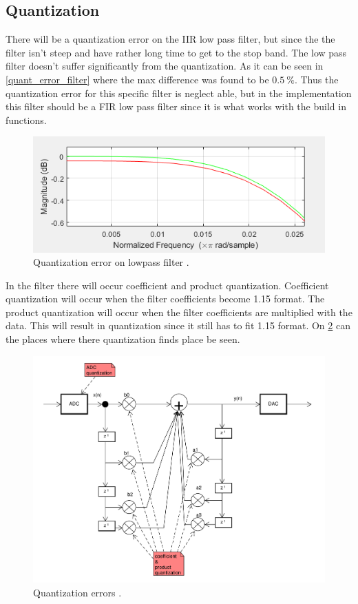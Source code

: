 \subsection{Quantization} 
There will be a quantization error on the IIR low pass filter, but since the the filter isn't steep and have rather long time to get to the stop band. 
The low pass filter doesn't suffer significantly from the quantization.  
As it can be seen in \cref{quant_error_filter} where the max difference was found to be $\SI{0.5}{\%} $.
Thus the quantization error for this specific filter is neglect able, but in the implementation this filter should be a FIR low pass filter since it is what works with the build in functions.
\begin{figure}
	\centering
	\includegraphics[width=1\linewidth]{gfx/QuantizationFilter.png}
	\caption{Quantization error on lowpass filter \systemName.}
	\label{fig:quant_error_filter}
\end{figure}
In the filter there will occur coefficient and product quantization. Coefficient quantization will occur when the filter coefficients become 1.15 format. The product quantization will occur when the filter coefficients are multiplied with the data. This will result in quantization since it still has to fit 1.15 format. On \cref{fig:quant_error} can the places where there quantization finds place be seen. 
\begin{figure}
	\centering
	\includegraphics[width=1\linewidth]{gfx/Design/flow_quant_error.pdf}
	\caption{Quantization errors \systemName.}
	\label{fig:quant_error}
\end{figure}


\FloatBarrier